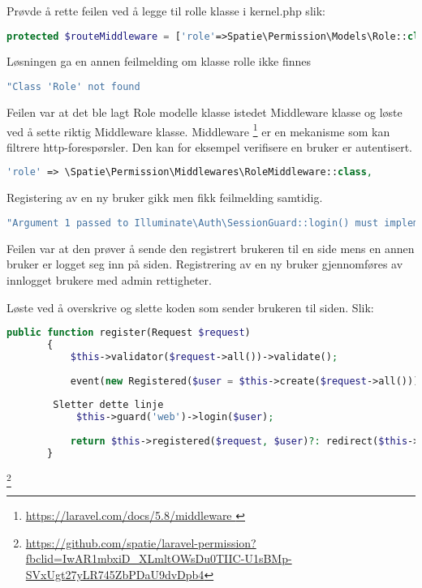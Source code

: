 Prøvde å rette feilen ved å legge til rolle klasse i kernel.php slik:
\begin{lstlisting}[language=PHP]
   protected $routeMiddleware = ['role'=>Spatie\Permission\Models\Role::class]; 
\end{lstlisting}  
Løsningen ga en annen feilmelding om klasse rolle ikke finnes
 \begin{lstlisting}[language=PHP]
      "Class 'Role' not found
 \end{lstlisting}

Feilen var at det ble lagt Role modelle klasse istedet Middleware klasse og løste ved å sette riktig Middleware klasse. Middleware \footnote{\url{https://laravel.com/docs/5.8/middleware }} er en mekanisme som kan  filtrere http-forespørsler. Den kan for eksempel verifisere en bruker er autentisert. 
\begin{lstlisting}[language=PHP]
   'role' => \Spatie\Permission\Middlewares\RoleMiddleware::class,
\end{lstlisting}

Registering av en ny bruker gikk men fikk feilmelding samtidig.
\begin{lstlisting}[language=PHP]
   "Argument 1 passed to Illuminate\Auth\SessionGuard::login() must implement interface Illuminate\Contracts\Auth\Authenticatable, null given,
\end{lstlisting}

Feilen var at den prøver å sende den registrert brukeren til en side mens en annen  bruker er logget seg inn på siden. Registrering av en ny bruker gjennomføres av innlogget brukere med admin rettigheter.

Løste ved å overskrive og slette koden som sender brukeren til siden. Slik:
\begin{lstlisting}[language=PHP]
   public function register(Request $request)
       {
           $this->validator($request->all())->validate();
    
           event(new Registered($user = $this->create($request->all())));
    
        Sletter dette linje
            $this->guard('web')->login($user);
    
           return $this->registered($request, $user)?: redirect($this->redirectPath());
       }
\end{lstlisting}
  
\footnote{\url{https://github.com/spatie/laravel-permission?fbclid=IwAR1mbxiD_XLmltOWsDu0TIIC-U1sBMp-SVxUgt27yLR745ZbPDaU9dvDpb4}}  
\clearpage